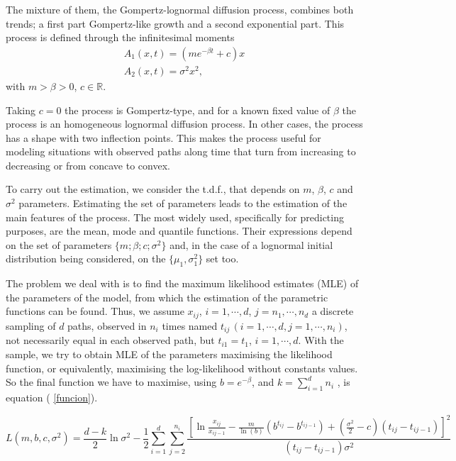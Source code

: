 \documentclass{sig-alternate}
\begin{document}
The mixture of them, the Gompertz-lognormal diffusion process, combines both trends; a first part Gompertz-like growth and a second exponential part. This process is defined through the infinitesimal moments
\[
\begin{array}{l}
A_1(x,t)=(m e^{-\beta t}+c)x \\
A_2(x,t)=\sigma^2 x^2,
\end{array}
\]
with $m > \beta > 0$, $c\in \mathbb{R}$.

Taking $c=0$ the process is Gompertz-type, and for a known fixed value of $\beta$ the process is an homogeneous lognormal diffusion process. In other cases, the process has a shape with two inflection points. This makes the process useful for modeling situations with observed paths along time that turn from increasing to decreasing or from concave to convex.

To carry out the estimation, we consider the t.d.f., that depends on $m$, $\beta$, $c$ and $\sigma^2$ parameters. Estimating the set of parameters leads to the estimation of the main features of the process. The most widely used, specifically for predicting purposes, are the mean, mode and quantile functions. Their expressions depend on the set of parameters $\{m;\beta; c; \sigma^2\}$ and, in the case of a lognormal initial distribution being considered, on the $\{ \mu_1, \sigma_1^2 \}$ set too.

The problem we deal with is to find the maximum likelihood estimates
(MLE) of the parameters of the model, from which the estimation of the
parametric functions can be found. Thus, we assume $x_{ij}$,
$i=1,\cdots,d$, $j=n_1, \cdots, n_d$ a discrete sampling of $d$ paths,
observed in $n_i$ times named $t_{ij}\,(i=1,\cdots,d,j=1,\cdots,n_i
)$, not necessarily equal in each observed path, but $t_{i1}=t_{1}$,
$i=1,\cdots, d$. With the sample, we try to obtain MLE of the
parameters maximising the likelihood function, or equivalently,
maximising the log-likelihood without constants values. So the final
function we have to maximise, using $b=e^{-\beta}$, and
$k=\sum_{i=1}^d n_i$ , is equation ( \ref{funcion}). 

\begin{figure*}[htb]
\begin{equation}
\label{funcion}
L(m,b,c,\sigma^2)=\frac{d-k}{2}\ln\sigma^2
-\frac{1}{2}\sum_{i=1}^d\sum_{j=2}^{n_i}\frac{\left[\ln\frac{x_{ij}}{x_{ij-1}}-
    \frac{m}{\ln(b)} \left(b^{t_{ij}}-b^{t_{ij-1}}\right)+\left(\frac{\sigma^2}{2}-c\right)(t_{ij}-t_{ij-1})\right]^2}
    {(t_{ij}-t_{ij-1})\sigma^2}
\end{equation}
\end{figure*}
\end{document}
